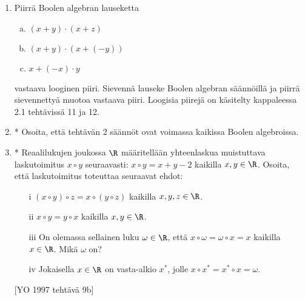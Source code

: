 \begin{enumerate}
\item
Piirrä Boolen algebran lauseketta
\begin{enumerate}[a)]
\item $(x + y) \cdot (x + z)$
\item $(x + y) \cdot (x + (-y))$
\item $x + (-x) \cdot y$
\end{enumerate}
vastaava looginen piiri. Sievennä lauseke Boolen algebran säännöillä ja piirrä sievennettyä muotoa vastaava piiri. Loogisia piirejä on käsitelty kappaleessa 2.1 tehtävissä 11 ja 12.

\item
* Osoita, että tehtävän 2 säännöt ovat voimassa kaikissa Boolen algebroissa.

\item
* Reaalilukujen joukossa $\R$ määritellään yhteenlaskua muistuttava laskutoimitus $x \circ y$ seuraavasti: $x \circ y = x + y - 2$ kaikilla $x, y \in \R$. Osoita, että laskutoimitus toteuttaa seuraavat ehdot: 
\begin{itemize}
\item[i]
$(x \circ y) \circ z = x \circ (y \circ z)$ kaikilla $x, y, z \in \R$. 
\item[ii]
$x \circ y = y \circ x$ kaikilla $x, y \in \R$. 
\item[iii]
On olemassa sellainen luku $\omega \in \R$, että $x \circ \omega = \omega \circ x = x$ kaikilla $x \in \R$. Mikä $\omega$ on? 
\item[iv]
Jokaisella $x \in \R$ on vasta-alkio $x^*$, jolle $x \circ x^* = x^* \circ x = \omega$. 
\end{itemize}
[YO 1997 tehtävä 9b]

\end{enumerate}

